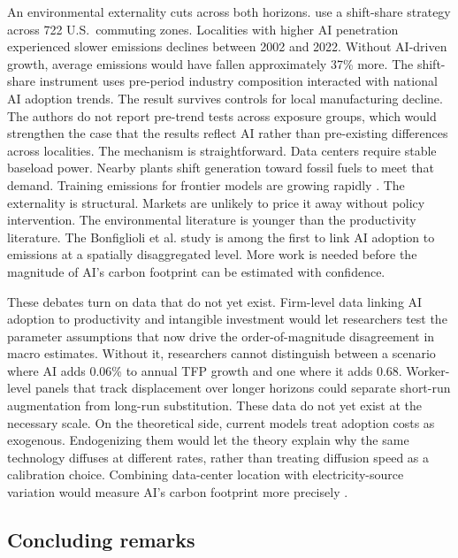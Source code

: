 \documentclass[12pt]{article}
\begin{document}
An environmental externality cuts across both horizons. \citet{bonfiglioli2025} use a shift-share strategy across 722 U.S.\ commuting zones. Localities with higher AI penetration experienced slower emissions declines between 2002 and 2022. Without AI-driven growth, average emissions would have fallen approximately 37\% more. The shift-share instrument uses pre-period industry composition interacted with national AI adoption trends. The result survives controls for local manufacturing decline. The authors do not report pre-trend tests across exposure groups, which would strengthen the case that the results reflect AI rather than pre-existing differences across localities. The mechanism is straightforward. Data centers require stable baseload power. Nearby plants shift generation toward fossil fuels to meet that demand. Training emissions for frontier models are growing rapidly \citep{stanfordhai2025}. The externality is structural. Markets are unlikely to price it away without policy intervention. The environmental literature is younger than the productivity literature. The Bonfiglioli et al. study is among the first to link AI adoption to emissions at a spatially disaggregated level. More work is needed before the magnitude of AI's carbon footprint can be estimated with confidence.

These debates turn on data that do not yet exist. Firm-level data linking AI adoption to productivity and intangible investment would let researchers test the parameter assumptions that now drive the order-of-magnitude disagreement in macro estimates. Without it, researchers cannot distinguish between a scenario where AI adds 0.06\% to annual TFP growth and one where it adds 0.68. Worker-level panels that track displacement over longer horizons could separate short-run augmentation from long-run substitution. These data do not yet exist at the necessary scale. On the theoretical side, current models treat adoption costs as exogenous. Endogenizing them would let the theory explain why the same technology diffuses at different rates, rather than treating diffusion speed as a calibration choice. Combining data-center location with electricity-source variation would measure AI's carbon footprint more precisely \citep{bonfiglioli2025, brynjolfsson2025agenda}.


\subsection{Concluding remarks}
\end{document}
